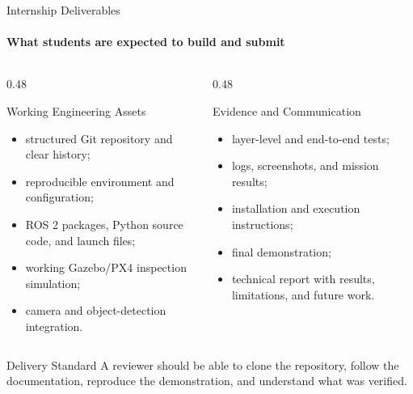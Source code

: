 \begin{frame}{Internship Deliverables}
\framesubtitle{What students are expected to build and submit}
\footnotesize
\begin{columns}[T,onlytextwidth]
    \begin{column}{0.48\textwidth}
        \begin{block}{Working Engineering Assets}
            \begin{itemize}
                \setlength{\itemsep}{0.22em}
                \item structured Git repository and clear history;
                \item reproducible environment and configuration;
                \item ROS 2 packages, Python source code, and launch files;
                \item working Gazebo/PX4 inspection simulation;
                \item camera and object-detection integration.
            \end{itemize}
        \end{block}
    \end{column}
    \begin{column}{0.48\textwidth}
        \begin{exampleblock}{Evidence and Communication}
            \begin{itemize}
                \setlength{\itemsep}{0.22em}
                \item layer-level and end-to-end tests;
                \item logs, screenshots, and mission results;
                \item installation and execution instructions;
                \item final demonstration;
                \item technical report with results, limitations, and future work.
            \end{itemize}
        \end{exampleblock}
    \end{column}
\end{columns}
\begin{alertblock}{Delivery Standard}
A reviewer should be able to clone the repository, follow the documentation, reproduce the demonstration, and understand what was verified.
\end{alertblock}
\end{frame}

